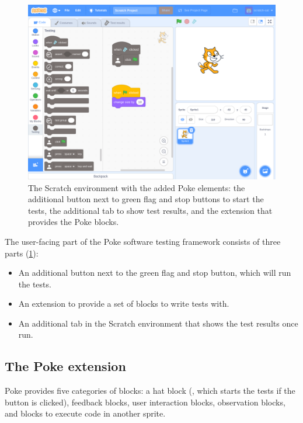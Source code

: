\documentclass[../main]{subfiles}
\begin{document}
\begin{figure}
    \begin{wide}
        \includegraphics[width=\linewidth]{poke-ui}
    \end{wide}
    \caption{The Scratch environment with the added Poke elements: the additional button next to green flag and stop buttons to start the tests, the additional tab to show test results, and the extension that provides the Poke blocks.}
    \label{fig:poke-ui}
\end{figure}

The user-facing part of the Poke software testing framework consists of three parts (\cref{fig:poke-ui}):

\begin{itemize}
    \item An additional button next to the green flag and stop button, which will run the tests.
    \item An extension to provide a set of blocks to write tests with.
    \item An additional tab in the Scratch environment that shows the test results once run.
\end{itemize}

\subsection{The Poke extension}\label{subsec:poke-provided-blocks}

Poke provides five categories of blocks: a hat block (, which starts the tests if the button is clicked), feedback blocks, user interaction blocks, observation blocks, and blocks to execute code in another sprite.
\end{document}
